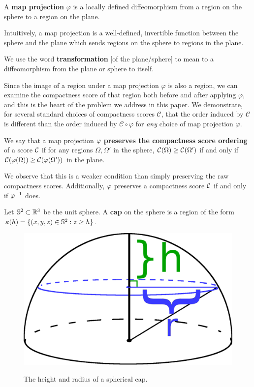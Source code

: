 \begin{definition}
  A \textbf{map projection} $\varphi$ is a locally defined 
  diffeomorphism from a region on the sphere to a region on the 
  plane. 
\end{definition}

Intuitively, a map projection is a well-defined, invertible function between the sphere and the plane which sends regions on the sphere to regions in the plane.

\begin{definition}
  We use the word \textbf{transformation} [of the plane/sphere] to mean
  to a diffeomorphism from the plane or sphere to itself.
\end{definition}

Since the image of a region under a map projection $\varphi$ is also
a region, we can examine the compactness score of that region both 
before and after applying $\varphi$, and this is the heart of the
problem we address in this paper.  We demonstrate, for several
standard choices of compactness scores $\mathcal{C}$, that the order
induced by $\mathcal{C}$ is different than the order induced by
$\mathcal{C}\circ\varphi$ for \textit{any} choice of map projection
$\varphi$.

\begin{definition}
  We say that a map projection $\varphi$ \textbf{preserves the  
  compactness score ordering} of a score $\mathcal{C}$ if for any regions 
  $\Omega,\Omega'$ in the sphere, $\mathcal{C}(\Omega)\ge \mathcal{C}(\Omega')$ 
  if and only if $\mathcal{C}(\varphi(\Omega)) \ge \mathcal{C}(\varphi(\Omega'))$ in the plane.
\end{definition}

  We observe that this is a weaker condition than simply preserving the raw compactness scores.  Additionally, $\varphi$ preserves a compactness score $\mathcal{C}$ 
  if and only if $\varphi^{-1}$ does.

\begin{definition}
  Let $\mathbb{S}^2\subset \mathbb{R}^3$ be the unit sphere. A 
  \textbf{cap} on the sphere is a region of the 
  form $\kappa(h) = \{(x,y,z)\in \mathbb{S}^2: z\ge h\}$.
\end{definition}

\begin{figure}
  \centering
  \includegraphics[width=.3\textwidth]{figs/spherecapschema}\\[1.5em]
  \caption{ The height and radius of a spherical cap. }
  \label{fig:caphr}
\end{figure}
